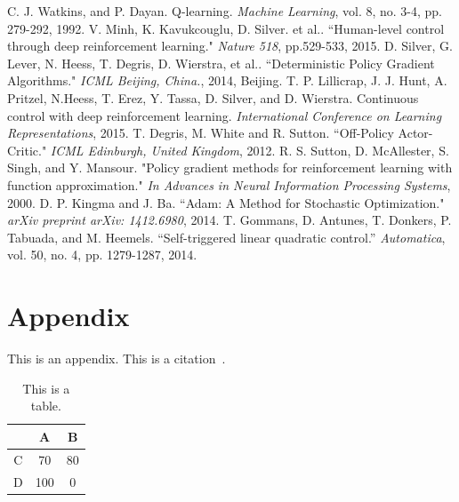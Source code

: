 \documentclass[english, dvipdfmx]{ampmt}             %
\def\numberofspines{1}
\begin{document}
\begin{thebibliography}{10}
C. J. Watkins, and P. Dayan. Q-learning. \textit{Machine Learning}, vol. 8, no. 3-4, pp. 279-292, 1992.
V. Minh, K. Kavukcouglu, D. Silver. et al.. “Human-level control through deep reinforcement learning." \textit{Nature 518}, pp.529-533, 2015.
D. Silver, G. Lever, N. Heess, T. Degris, D. Wierstra, et al.. “Deterministic Policy Gradient Algorithms." \textit{ICML Beijing, China.}, 2014, Beijing.
T. P. Lillicrap, J. J. Hunt, A. Pritzel, N.Heess, T. Erez, Y. Tassa, D. Silver, and D. Wierstra. Continuous control with deep reinforcement learning. \textit{International Conference on Learning Representations}, 2015.
T. Degris, M. White and R. Sutton. “Off-Policy Actor-Critic." \textit{ICML Edinburgh, United Kingdom}, 2012.
R. S. Sutton, D. McAllester, S. Singh, and Y. Mansour. "Policy gradient methods for reinforcement learning with function approximation." \textit{In Advances in Neural Information Processing Systems}, 2000.
D. P. Kingma and J. Ba. “Adam: A Method for Stochastic Optimization." \textit{arXiv preprint arXiv: 1412.6980}, 2014.
T. Gommans, D. Antunes, T. Donkers, P. Tabuada, and M. Heemels. “Self-triggered linear quadratic control.” \textit{Automatica}, vol. 50, no. 4, pp. 1279-1287, 2014.

\end{thebibliography}

\appendix

\section{Appendix}
This is an appendix. This is a citation~\cite{polya1945}.

\begin{table}[htbp]
  \caption{This is a table.}
  \centering
  \begin{tabular}{c|cc}
      &  A  &  B \\
    \hline
    C &  70 & 80 \\
    D & 100 &  0
  \end{tabular}
\end{table}

\fi
\ifoutputcover
\cleardoublepage
\makecover                      %
\makespine[\numberofspines]     %
\fi
\ifoutputabstractforsubmission
\makeabstractforsubmission      %
\fi
\end{document}
